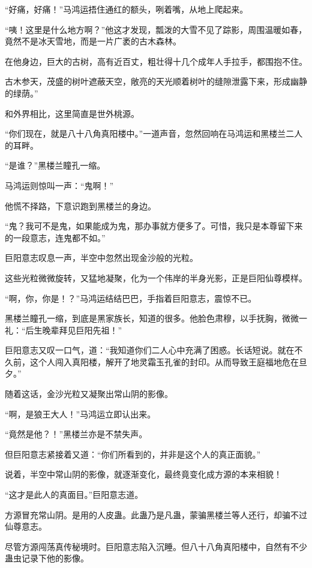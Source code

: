 
\begin{this_body}

“好痛，好痛！”马鸿运捂住通红的额头，咧着嘴，从地上爬起来。

“咦！这里是什么地方啊？”他这才发现，瓢泼的大雪不见了踪影，周围温暖如春，竟然不是冰天雪地，而是一片广袤的古木森林。

在他身边，巨大的古树，高有近百丈，粗壮得十几个成年人手拉手，都围抱不住。

古木参天，茂盛的树叶遮蔽天空，敞亮的天光顺着树叶的缝隙泄露下来，形成幽静的绿荫。”

和外界相比，这里简直是世外桃源。

“你们现在，就是八十八角真阳楼中。”一道声音，忽然回响在马鸿运和黑楼兰二人的耳畔。

“是谁？”黑楼兰瞳孔一缩。

马鸿运则惊叫一声：“鬼啊！”

他慌不择路，下意识跑到黑楼兰的身边。

“鬼？我可不是鬼，如果能成为鬼，那办事就方便多了。可惜，我只是本尊留下来的一段意志，连鬼都不如。”

巨阳意志叹息一声，半空中忽然出现金沙般的光粒。

这些光粒微微旋转，又猛地凝聚，化为一个伟岸的半身光影，正是巨阳仙尊模样。

“啊，你，你是！？”马鸿运结结巴巴，手指着巨阳意志，震惊不已。

黑楼兰瞳孔一缩，到底是黑家族长，知道的很多。他脸色肃穆，以手抚胸，微微一礼：“后生晚辈拜见巨阳先祖！”

巨阳意志又叹一口气，道：“我知道你们二人心中充满了困惑。长话短说。就在不久前，这个人闯入真阳楼，解开了地灵霜玉孔雀的封印。从而导致王庭福地危在旦夕。”

随着这话，金沙光粒又凝聚出常山阴的影像。

“啊，是狼王大人！”马鸿运立即认出来。

“竟然是他？！”黑楼兰亦是不禁失声。

但巨阳意志紧接着又道：“你们所看到的，并非是这个人的真正面貌。”

说着，半空中常山阴的影像，就逐渐变化，最终竟变化成方源的本来相貌！

“这才是此人的真面目。”巨阳意志道。

方源冒充常山阴。是用的人皮蛊。此蛊乃是凡蛊，蒙骗黑楼兰等人还行，却骗不过仙尊意志。

尽管方源闯荡真传秘境时。巨阳意志陷入沉睡。但八十八角真阳楼中，自然有不少蛊虫记录下他的影像。


\end{this_body}
